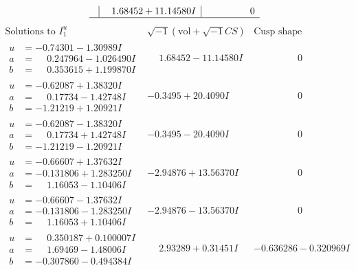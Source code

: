 \documentclass[1p]{elsarticle_modified}
\theoremstyle{definition}
\newcommand{\I}{\sqrt{-1}}
\begin{document}
$$\begin{array}{c|c|c}
 & \phantom{-}1.68452 + 11.14580 I & \phantom{-0.000000 } 0\\
 \hline 
 \end{array}$$\newpage$$\begin{array}{c|c|c}  
\text{Solutions to }I^u_{1}& \I (\text{vol} + \sqrt{-1}CS) & \text{Cusp shape}\\
 \hline 
\begin{aligned}
u &= -0.74301 - 1.30989 I \\
a &= \phantom{-}0.247964 - 1.026490 I \\
b &= \phantom{-}0.353615 + 1.199870 I\end{aligned}
 & \phantom{-}1.68452 - 11.14580 I & \phantom{-0.000000 } 0 \\ \hline\begin{aligned}
u &= -0.62087 + 1.38320 I \\
a &= \phantom{-}0.17734 - 1.42748 I \\
b &= -1.21219 + 1.20921 I\end{aligned}
 & -0.3495 + 20.4090 I & \phantom{-0.000000 } 0 \\ \hline\begin{aligned}
u &= -0.62087 - 1.38320 I \\
a &= \phantom{-}0.17734 + 1.42748 I \\
b &= -1.21219 - 1.20921 I\end{aligned}
 & -0.3495 - 20.4090 I & \phantom{-0.000000 } 0 \\ \hline\begin{aligned}
u &= -0.66607 + 1.37632 I \\
a &= -0.131806 + 1.283250 I \\
b &= \phantom{-}1.16053 - 1.10406 I\end{aligned}
 & -2.94876 + 13.56370 I & \phantom{-0.000000 } 0 \\ \hline\begin{aligned}
u &= -0.66607 - 1.37632 I \\
a &= -0.131806 - 1.283250 I \\
b &= \phantom{-}1.16053 + 1.10406 I\end{aligned}
 & -2.94876 - 13.56370 I & \phantom{-0.000000 } 0 \\ \hline\begin{aligned}
u &= \phantom{-}0.350187 + 0.100007 I \\
a &= \phantom{-}1.69469 - 1.48006 I \\
b &= -0.307860 - 0.494384 I\end{aligned}
 & \phantom{-}2.93289 + 0.31451 I & -0.636286 - 0.320969 I \\ \hline\begin{aligned}

\end{aligned}
\end{array}$$
\end{document}
